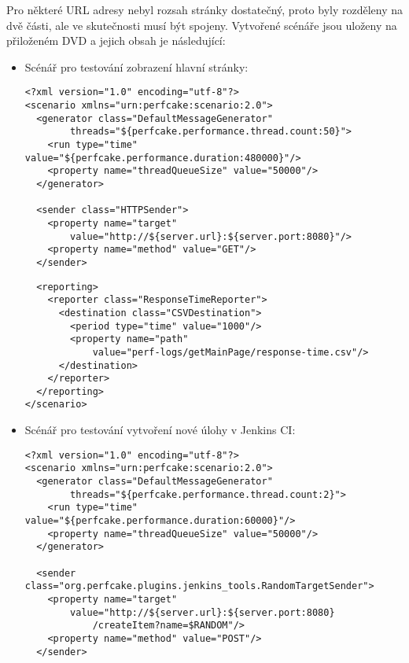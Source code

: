     Pro některé URL adresy nebyl rozsah stránky dostatečný, proto byly
    rozděleny na dvě části, ale ve skutečnosti musí být spojeny.
    Vytvořené scénáře jsou uloženy na přiloženém DVD a jejich obsah je následující:
       \begin{itemize}
        \item Scénář pro testování zobrazení hlavní stránky:
\begin{verbatim}
<?xml version="1.0" encoding="utf-8"?>
<scenario xmlns="urn:perfcake:scenario:2.0">
  <generator class="DefaultMessageGenerator" 
        threads="${perfcake.performance.thread.count:50}">
    <run type="time" value="${perfcake.performance.duration:480000}"/>
    <property name="threadQueueSize" value="50000"/>
  </generator>
  
  <sender class="HTTPSender">
    <property name="target" 
        value="http://${server.url}:${server.port:8080}"/>
    <property name="method" value="GET"/>                                                                                               
  </sender>
\end{verbatim}
  

\newpage
\begin{verbatim}
  <reporting>
    <reporter class="ResponseTimeReporter">
      <destination class="CSVDestination">
        <period type="time" value="1000"/>
        <property name="path" 
            value="perf-logs/getMainPage/response-time.csv"/>
      </destination>
    </reporter>
  </reporting>
</scenario>
\end{verbatim}

        \item Scénář pro testování vytvoření nové úlohy v Jenkins CI:
\begin{verbatim}
<?xml version="1.0" encoding="utf-8"?>
<scenario xmlns="urn:perfcake:scenario:2.0">
  <generator class="DefaultMessageGenerator" 
        threads="${perfcake.performance.thread.count:2}">
    <run type="time" value="${perfcake.performance.duration:60000}"/>                                                                         
    <property name="threadQueueSize" value="50000"/>                                                                                         
  </generator>
              
  <sender class="org.perfcake.plugins.jenkins_tools.RandomTargetSender">
    <property name="target" 
        value="http://${server.url}:${server.port:8080}
            /createItem?name=$RANDOM"/>
    <property name="method" value="POST"/>
  </sender>


\end{verbatim}
\end{itemize}
